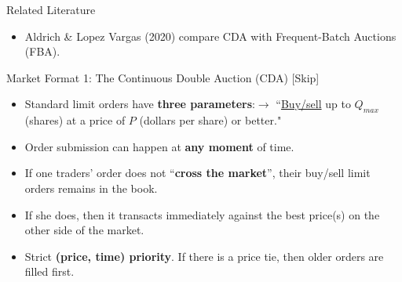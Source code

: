 \documentclass[10pt]{beamer}
\begin{document}
\begin{frame}{Related Literature}
\begin{itemize}

    
    
    
        \item Aldrich \& Lopez Vargas (2020) compare CDA with Frequent-Batch Auctions (FBA). 



    \end{itemize}
\end{frame}

\begin{frame}{Market Format 1: The Continuous Double Auction (CDA)}
[Skip] \\
    \begin{itemize}
        \item Standard limit orders have \textbf{three parameters}:$\rightarrow$ ``\underline{Buy/sell} up to \underline{$Q_{max}$} (shares) at a price of \underline{$P$} (dollars per share) or better."
        \item Order submission can happen at \textbf{any moment} of time. 
        \item If one traders' order does not ``\textbf{cross the market}'', their buy/sell limit orders remains in the book. 
        \item If she does, then it transacts immediately against the best price(s) on the other side of the market.
        \item Strict \textbf{(price, time) priority}. If there is a price tie, then older orders are filled first.
    \end{itemize} 
\end{frame}
\end{document}
